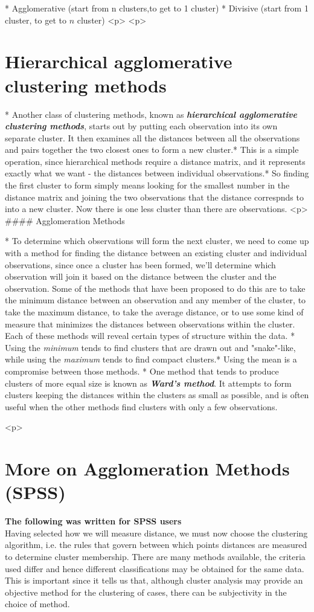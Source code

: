 *  Agglomerative (start from n clusters,to get to 1 cluster)
*  Divisive (start from 1 cluster, to get to $n$ cluster)
<p>
<p>
\section{Hierarchical agglomerative clustering methods}

*  Another class of clustering methods, known as \textbf{\textit{hierarchical agglomerative clustering methods}}, starts out by putting each observation into its own separate cluster. It then examines all the distances between all the observations and pairs together the two closest ones to form a new cluster.* This is a simple operation, since hierarchical methods require a distance matrix, and it represents exactly what we want - the distances between individual observations.* So finding the first cluster to form simply means looking for the smallest number in the distance matrix and joining the two observations that the distance correspnds to into a new cluster. Now there is one less cluster than there are observations. 
<p>
#### {Agglomeration Methods}

*  To determine which observations will form the next cluster, we need to come up with a method for finding the distance between an existing cluster and individual observations, since once a cluster has been formed, we'll determine which observation will join it based on the distance between the cluster and the observation. Some of the methods that have been proposed to do this are to take the minimum distance between an observation and any member of the cluster, to take the maximum distance, to take the average distance, or to use some kind of measure that minimizes the distances between observations within the cluster. Each of these methods will reveal certain types of structure within the data. *  Using the \textit{minimum} tends to find clusters that are drawn out and "snake"-like, while using the \textit{maximum} tends to find compact clusters.* Using the mean is a compromise between those methods.
*  One method that tends to produce clusters of more equal size is known as \textbf{\textit{Ward's method}}. It attempts to form clusters keeping the distances within the clusters as small as possible, and is often useful when the other methods find clusters with only a few observations. 

<p>
\section{More on Agglomeration Methods (SPSS)}
\textbf{The following was written for SPSS users} \\
Having selected how we will measure distance, we must now choose the clustering algorithm, i.e. the rules that govern between which points distances are measured to determine cluster membership. There are many methods available, the criteria used differ and hence
different classifications may be obtained for the same data. This is important since it tells us that, although cluster analysis may provide an objective method for the clustering of cases, there can be subjectivity in the choice of method. 

